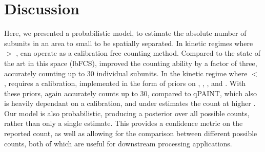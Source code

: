 \section{Discussion}
Here, we presented \ours a probabilistic model, to estimate the absolute 
number of subunits in an area to small to be spatially separated. 
    In kinetic regimes where \pon $>$ \poff, \ours can operate 
    as a calibration free counting method.
    Compared to the state of the art in this space (lbFCS), \ours improved 
    the counting ability by a factor of three, accurately counting 
    up to 30 individual subunits.
    In the kinetic regime where \pon $<$ \poff, \ours requires a calibration, 
    implemented in the form of priors on \pon, \poff, \re, and \rb.
    With these priors, \ours again accurately counts up to 30, compared to qPAINT, 
    which also is heavily dependant on a calibration, and under estimates the count at higher \n.
    Our model is also probabilistic, producing a posterior over all possible counts, rather than only a single estimate.
    This provides a confidence metric on the reported count, as well as allowing for the comparison between different possible counts, 
    both of which are useful for downstream processing applications. 

